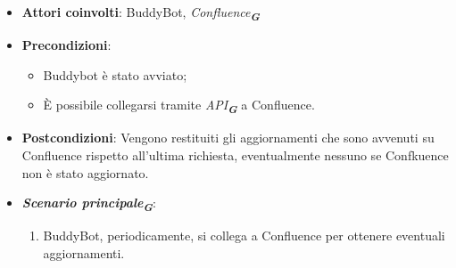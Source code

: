 
\begin{itemize}
    \item \textbf{Attori coinvolti}: BuddyBot, \emph{Confluence}\textsubscript{\textbf{\textit{G}}}
    \item \textbf{Precondizioni}: 
    \begin{itemize}
        \item Buddybot è stato avviato;
        \item È possibile collegarsi tramite \emph{API}\textsubscript{\textbf{\textit{G}}} a Confluence.
    \end{itemize}
    \item \textbf{Postcondizioni}: Vengono restituiti gli aggiornamenti che sono avvenuti su Confluence rispetto all'ultima richiesta, eventualmente nessuno 
    se Confkuence non è stato aggiornato.
    \item \textbf{\emph{Scenario principale}\textsubscript{\textbf{\textit{G}}}}:
    \begin{enumerate}
        \item BuddyBot, periodicamente, si collega a Confluence per ottenere eventuali aggiornamenti.
    \end{enumerate}
\end{itemize}




